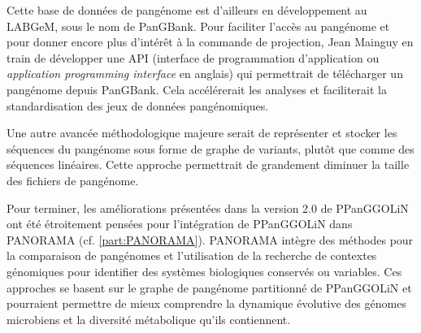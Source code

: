 \newpage
Cette base de données de pangénome est d'ailleurs en développement au LABGeM, sous le nom de PanGBank. Pour faciliter l'accès au pangénome et pour donner encore plus d'intérêt à la commande de projection, Jean Mainguy en train de développer une API (interface de programmation d'application ou \textit{application programming interface} en anglais) qui permettrait de télécharger un pangénome depuis PanGBank. Cela accélérerait les analyses et faciliterait la standardisation des jeux de données pangénomiques.

Une autre avancée méthodologique majeure serait de représenter et stocker les séquences du pangénome sous forme de graphe de variants, plutôt que comme des séquences linéaires. Cette approche permettrait de grandement diminuer la taille des fichiers de pangénome.

Pour terminer, les améliorations présentées dans la version 2.0 de PPanGGOLiN ont été étroitement pensées pour l’intégration de PPanGGOLiN dans PANORAMA (cf. \autoref{part:PANORAMA}). PANORAMA intègre des méthodes pour la comparaison de pangénomes et l’utilisation de la recherche de contextes génomiques pour identifier des systèmes biologiques conservés ou variables. Ces approches se basent sur le graphe de pangénome partitionné de PPanGGOLiN et pourraient permettre de mieux comprendre la dynamique évolutive des génomes microbiens et la diversité métabolique qu'ils contiennent.